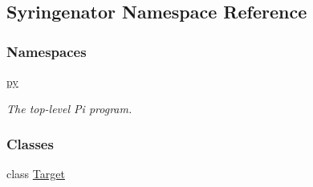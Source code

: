 \hypertarget{namespaceSyringenator}{}\subsection{Syringenator Namespace Reference}
\label{namespaceSyringenator}
\subsubsection*{Namespaces}
\begin{DoxyCompactItemize}
\item 
 \mbox{\hyperlink{namespaceSyringenator_1_1py}{py}}
\begin{DoxyCompactList}\small\item\em The top-\/level Pi program. \end{DoxyCompactList}\end{DoxyCompactItemize}
\subsubsection*{Classes}
\begin{DoxyCompactItemize}
\item 
class \mbox{\hyperlink{classSyringenator_1_1Target}{Target}}
\end{DoxyCompactItemize}
